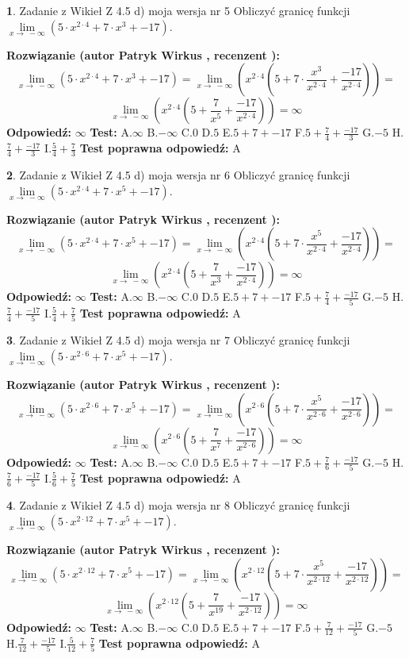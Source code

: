 \documentclass[12pt, a4paper]{article}
\theoremstyle{definition} %
\newtheorem{zad}{}
\newcommand{\zadStart}[1]{\begin{zad}#1\newline}
\newcommand{\zadStop}{\end{zad}}
\newcommand{\rozwStart}[2]{\noindent \textbf{Rozwiązanie (autor #1 , recenzent #2): }\newline}
\newcommand{\rozwStop}{\newline}
\newcommand{\odpStart}{\noindent \textbf{Odpowiedź:}\newline}
\newcommand{\odpStop}{\newline}
\newcommand{\testStart}{\noindent \textbf{Test:}\newline}
\newcommand{\testStop}{\newline}
\newcommand{\kluczStart}{\noindent \textbf{Test poprawna odpowiedź:}\newline}
\newcommand{\kluczStop}{\newline}
\begin{document}
\zadStart{Zadanie z Wikieł Z 4.5 d) moja wersja nr 5}
Obliczyć granicę funkcji  $\lim\limits_{x\to\ -\infty}(5 \cdot x^{2\cdot4}+7 \cdot x^{3}+-17)$.
\zadStop
\rozwStart{Patryk Wirkus}{}
$$\lim\limits_{x\to\ -\infty}(5 \cdot x^{2\cdot4}+7 \cdot x^{3}+-17) = \lim\limits_{x\to\ -\infty}(x^{2\cdot4}(5 +7 \cdot \frac{x^{3}}{x^{2\cdot4}}+\frac{-17}{x^{2\cdot4}})) =$$ $$\lim\limits_{x\to\ -\infty}(x^{2\cdot4}(5 +\frac{7}{x^{5}}+\frac{-17}{x^{2\cdot4}})) =\infty$$
\rozwStop
\odpStart
$\infty$
\odpStop
\testStart
A.$\infty$ B.$-\infty$ C.$0$ D.$5$ E.$5 + 7 + -17$
F.$5+\frac{7}{4}+\frac{-17}{3}$ G.$-5$
H.$\frac{7}{4}+\frac{-17}{3}$
I.$\frac{5}{4}+\frac{7}{3}$
\testStop
\kluczStart
A
\kluczStop



\zadStart{Zadanie z Wikieł Z 4.5 d) moja wersja nr 6}
Obliczyć granicę funkcji  $\lim\limits_{x\to\ -\infty}(5 \cdot x^{2\cdot4}+7 \cdot x^{5}+-17)$.
\zadStop
\rozwStart{Patryk Wirkus}{}
$$\lim\limits_{x\to\ -\infty}(5 \cdot x^{2\cdot4}+7 \cdot x^{5}+-17) = \lim\limits_{x\to\ -\infty}(x^{2\cdot4}(5 +7 \cdot \frac{x^{5}}{x^{2\cdot4}}+\frac{-17}{x^{2\cdot4}})) =$$ $$\lim\limits_{x\to\ -\infty}(x^{2\cdot4}(5 +\frac{7}{x^{3}}+\frac{-17}{x^{2\cdot4}})) =\infty$$
\rozwStop
\odpStart
$\infty$
\odpStop
\testStart
A.$\infty$ B.$-\infty$ C.$0$ D.$5$ E.$5 + 7 + -17$
F.$5+\frac{7}{4}+\frac{-17}{5}$ G.$-5$
H.$\frac{7}{4}+\frac{-17}{5}$
I.$\frac{5}{4}+\frac{7}{5}$
\testStop
\kluczStart
A
\kluczStop



\zadStart{Zadanie z Wikieł Z 4.5 d) moja wersja nr 7}
Obliczyć granicę funkcji  $\lim\limits_{x\to\ -\infty}(5 \cdot x^{2\cdot6}+7 \cdot x^{5}+-17)$.
\zadStop
\rozwStart{Patryk Wirkus}{}
$$\lim\limits_{x\to\ -\infty}(5 \cdot x^{2\cdot6}+7 \cdot x^{5}+-17) = \lim\limits_{x\to\ -\infty}(x^{2\cdot6}(5 +7 \cdot \frac{x^{5}}{x^{2\cdot6}}+\frac{-17}{x^{2\cdot6}})) =$$ $$\lim\limits_{x\to\ -\infty}(x^{2\cdot6}(5 +\frac{7}{x^{7}}+\frac{-17}{x^{2\cdot6}})) =\infty$$
\rozwStop
\odpStart
$\infty$
\odpStop
\testStart
A.$\infty$ B.$-\infty$ C.$0$ D.$5$ E.$5 + 7 + -17$
F.$5+\frac{7}{6}+\frac{-17}{5}$ G.$-5$
H.$\frac{7}{6}+\frac{-17}{5}$
I.$\frac{5}{6}+\frac{7}{5}$
\testStop
\kluczStart
A
\kluczStop



\zadStart{Zadanie z Wikieł Z 4.5 d) moja wersja nr 8}
Obliczyć granicę funkcji  $\lim\limits_{x\to\ -\infty}(5 \cdot x^{2\cdot12}+7 \cdot x^{5}+-17)$.
\zadStop
\rozwStart{Patryk Wirkus}{}
$$\lim\limits_{x\to\ -\infty}(5 \cdot x^{2\cdot12}+7 \cdot x^{5}+-17) = \lim\limits_{x\to\ -\infty}(x^{2\cdot12}(5 +7 \cdot \frac{x^{5}}{x^{2\cdot12}}+\frac{-17}{x^{2\cdot12}})) =$$ $$\lim\limits_{x\to\ -\infty}(x^{2\cdot12}(5 +\frac{7}{x^{19}}+\frac{-17}{x^{2\cdot12}})) =\infty$$
\rozwStop
\odpStart
$\infty$
\odpStop
\testStart
A.$\infty$ B.$-\infty$ C.$0$ D.$5$ E.$5 + 7 + -17$
F.$5+\frac{7}{12}+\frac{-17}{5}$ G.$-5$
H.$\frac{7}{12}+\frac{-17}{5}$
I.$\frac{5}{12}+\frac{7}{5}$
\testStop
\kluczStart
A
\kluczStop
\end{document}
